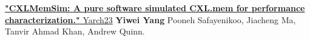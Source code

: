 \documentclass{resume}
\newcommand{\en}[1]{#1}
\newcommand{\zh}[1]{}
\begin{document}

\href{https://arxiv.org/pdf/2303.06153}{\textbf{"CXLMemSim: A pure software simulated CXL.mem for performance characterization."} Yarch23} \textbf{Yiwei Yang} Pooneh Safayenikoo, Jiacheng Ma, Tanvir Ahmad Khan, Andrew Quinn.

      
\end{document}
